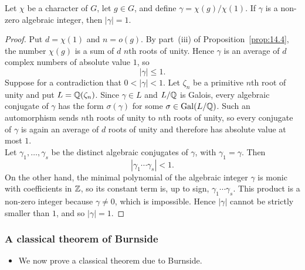 \documentclass[../Odyssey_Project.tex]{subfiles}
\begin{document}
\begin{lemma}
\label{lem:17.6}
Let $\chi$ be a character of $G$, let $g \in G$, and define $\gamma = \chi(g)/\chi(1)$. If $\gamma$ is a non-zero algebraic integer, then $|\gamma| = 1$.
\end{lemma}
\begin{proof}
    Put $d=\chi(1)$ and $n=o(g)$. By part~(iii) of Proposition~\ref{prop:14.4}, the number $\chi(g)$ is a sum of $d$ $n$th roots of unity. Hence $\gamma$ is an average of $d$ complex numbers of absolute value $1$, so
    \[
        |\gamma|\leq1.
    \]
    Suppose for a contradiction that $0<|\gamma|<1$. Let $\zeta_n$ be a primitive $n$th root of unity and put $L=\mathbb{Q}(\zeta_n)$. Since $\gamma\in L$ and $L/\mathbb{Q}$ is Galois, every algebraic conjugate of $\gamma$ has the form $\sigma(\gamma)$ for some $\sigma\in\operatorname{Gal}(L/\mathbb{Q})$. Such an automorphism sends $n$th roots of unity to $n$th roots of unity, so every conjugate of $\gamma$ is again an average of $d$ roots of unity and therefore has absolute value at most $1$.\\
    Let $\gamma_1,\ldots,\gamma_s$ be the distinct algebraic conjugates of $\gamma$, with $\gamma_1=\gamma$. Then
    \[
        \left|\gamma_1\cdots\gamma_s\right|<1.
    \]
    On the other hand, the minimal polynomial of the algebraic integer $\gamma$ is monic with coefficients in $\mathbb{Z}$, so its constant term is, up to sign, $\gamma_1\cdots\gamma_s$. This product is a non-zero integer because $\gamma\neq0$, which is impossible. Hence $|\gamma|$ cannot be strictly smaller than $1$, and so $|\gamma|=1$.
\end{proof}

\subsubsection*{A classical theorem of Burnside}
\begin{itemize}
    \item We now prove a classical theorem due to Burnside.
\end{itemize}
\end{document}
